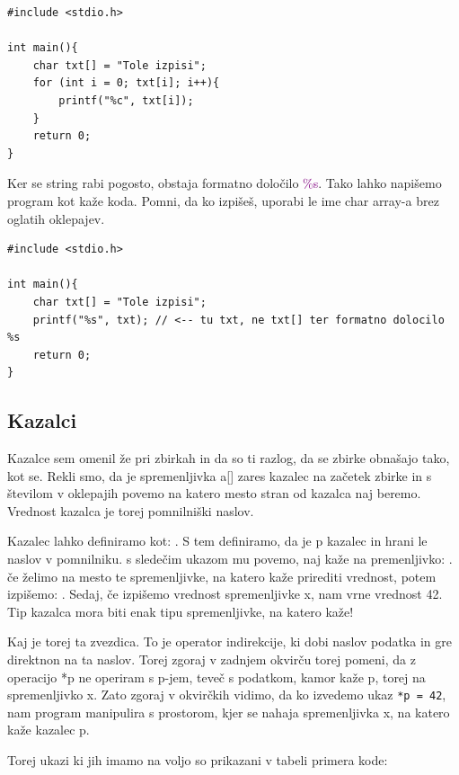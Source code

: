 \documentclass[a4paper, 12pt]{article}
\begin{document}
\begin{lstlisting}[caption = Znakovni niz: navajanje 1]
#include <stdio.h>

int main(){
	char txt[] = "Tole izpisi";
	for (int i = 0; txt[i]; i++){
		printf("%c", txt[i]);
	}
	return 0;
}
\end{lstlisting}

Ker se string rabi pogosto, obstaja formatno določilo \textcolor{purple}{\%s}. Tako lahko napišemo program kot kaže koda. Pomni, da ko izpišeš, uporabi le ime char array-a brez oglatih oklepajev.

\begin{lstlisting}[caption = Znakovni niz: navajanje 2]
#include <stdio.h>

int main(){
	char txt[] = "Tole izpisi";
	printf("%s", txt); // <-- tu txt, ne txt[] ter formatno dolocilo %s
	return 0;
}
\end{lstlisting}

\subsection{Kazalci}

Kazalce sem omenil že pri zbirkah in da so ti razlog, da se zbirke obnašajo tako, kot se. Rekli smo, da je spremenljivka a[] zares kazalec na začetek zbirke in s številom v oklepajih povemo na katero mesto stran od kazalca naj beremo. Vrednost kazalca je torej pomnilniški naslov.\

Kazalec lahko definiramo kot: . S tem definiramo, da je p kazalec in hrani le naslov v pomnilniku. s sledečim ukazom mu povemo, naj kaže na premenljivko:  . če želimo na mesto te spremenljivke, na katero kaže prirediti vrednost, potem izpišemo: . Sedaj, če izpišemo vrednost spremenljivke x, nam vrne vrednost 42. Tip kazalca mora biti enak tipu spremenljivke, na katero kaže!\

Kaj je torej ta zvezdica. To je operator indirekcije, ki dobi naslov podatka in gre direktnon na ta naslov. Torej zgoraj v zadnjem okvirču torej pomeni, da z operacijo *p ne operiram s p-jem, teveč s podatkom, kamor kaže p, torej na spremenljivko x. Zato zgoraj v okvirčkih vidimo, da ko izvedemo ukaz \lstinline|*p = 42|, nam program manipulira s prostorom, kjer se nahaja spremenljivka x, na katero kaže kazalec p.

Torej ukazi ki jih imamo na voljo so prikazani v tabeli primera kode:
\end{document}
